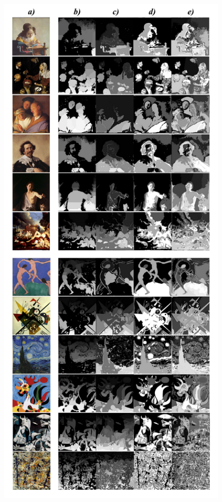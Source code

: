 \begin{figure}[h!]
\begin{center}
        \includegraphics[scale=.3]{figs/expsegs}
        \fonteminha
\end{center}
\end{figure}

